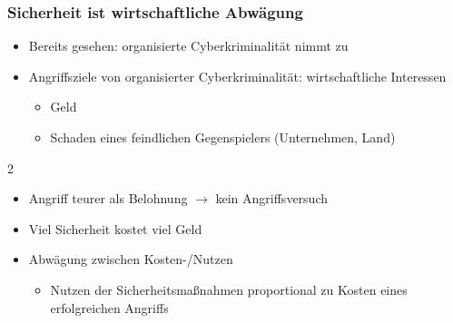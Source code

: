 \subsubsection*{Sicherheit ist wirtschaftliche Abwägung}
\begin{itemize}
    \item Bereits gesehen: organisierte Cyberkriminalität nimmt zu
    \item Angriffsziele von organisierter Cyberkriminalität: wirtschaftliche Interessen
    \begin{itemize}
        \item Geld
        \item Schaden eines feindlichen Gegenspielers (Unternehmen, Land)
    \end{itemize}
\end{itemize}
\begin{multicols}{2}
    \begin{defBox}[title=\blockTitle{Aus Sicht der angreifenden Partei:}]
        \begin{itemize}
            \item Angriff teurer als Belohnung $\rightarrow$ kein Angriffsversuch
        \end{itemize}
    \end{defBox}
    \columnbreak
    \begin{defBox}[title=\blockTitle{Aus Sicht der verteidigenden Partei:}]
    \begin{itemize}
        \item Viel Sicherheit kostet viel Geld
        \item Abwägung zwischen Kosten-/Nutzen
        \begin{itemize}
            \item Nutzen der Sicherheitsmaßnahmen proportional zu Kosten eines erfolgreichen Angriffs
        \end{itemize}
    \end{itemize}
    \end{defBox}
\end{multicols}

